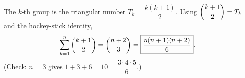 The $k$-th group is the triangular number $T_k=\dfrac{k(k+1)}{2}$. Using $\dbinom{k+1}{2}=T_k$ and the hockey-stick identity,
\[\sum_{k=1}^{n}\dbinom{k+1}{2}=\dbinom{n+2}{3}=\boxed{\dfrac{n(n+1)(n+2)}{6}}.\]
(Check: $n=3$ gives $1+3+6=10=\dfrac{3\cdot4\cdot5}{6}$.)
